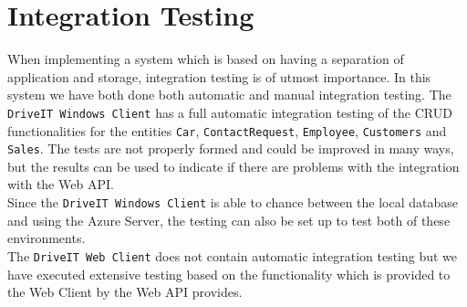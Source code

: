 \section{Integration Testing}
When implementing a system which is based on having a separation of application and storage, integration testing is of utmost importance. In this system we have both done both automatic and manual integration testing. The \texttt{DriveIT Windows Client} has a full automatic integration testing of the CRUD functionalities for the entities \texttt{Car}, \texttt{ContactRequest}, \texttt{Employee}, \texttt{Customers} and \texttt{Sales}. The tests are not properly formed and could be improved in many ways, but the results can be used to indicate if there are problems with the integration with the Web API.\\
Since the \texttt{DriveIT Windows Client} is able to chance between the local database and using the Azure Server, the testing can also be set up to test both of these environments. \\
The \texttt{DriveIT Web Client} does not contain automatic integration testing but we have executed extensive testing based on the functionality which is provided to the Web Client by the Web API provides.